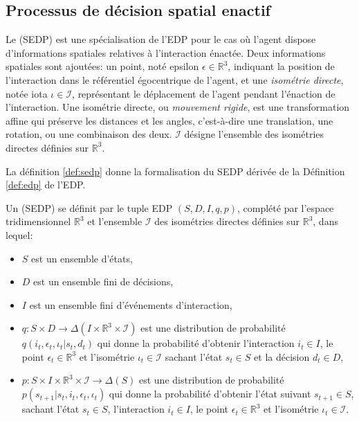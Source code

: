 \subsection{Processus de décision spatial enactif }
\label{sec:sedp}

\noindent
Le  (SEDP) est une spécialisation de l'EDP pour le cas où l'agent dispose d'informations spatiales relatives à l'interaction énactée.  
Deux informations spatiales sont ajoutées: un point, noté epsilon $\epsilon \in \mathbb{R}^3$, indiquant la position de l'interaction dans le référentiel égocentrique de l'agent, 
et une \emph{isométrie directe}, notée iota $\iota \in \mathcal{I}$, représentant le déplacement de l'agent pendant l'énaction de l'interaction.
Une isométrie directe, ou \emph{mouvement rigide}, est une transformation affine qui préserve les distances et les angles, c'est-à-dire une translation, une rotation, ou une combinaison des deux.
$\mathcal{I}$ désigne l'ensemble des isométries directes définies sur $\mathbb{R}^3$.


La définition \ref{def:sedp} donne la formalisation du SEDP dérivée de la Définition \ref{def:edp} de l'EDP. 

\begin{De}[SEDP]
	\label{def:sedp}
	Un  (SEDP) se définit par le tuple EDP $(S, D, I, q, p)$, complété par l'espace tridimensionnel $\mathbb{R}^3$ et l'ensemble $\mathcal{I}$ des isométries directes définies sur $\mathbb{R}^3$, dans lequel:
	\begin{itemize}[label=\scalebox{.85}{$\diamond$}]
		\item $S$ est un ensemble d'états,
		\item $D$ est un ensemble fini de décisions,
		\item $I$ est un ensemble fini d'événements d'interaction,
		\item $q: S\times D \to \Delta(I \times \mathbb{R}^3 \times \mathcal{I})$ est une distribution de probabilité $q(i_t, \epsilon_t, \iota_t|s_t,d_t)$ qui donne la probabilité d'obtenir l'interaction $i_t \in I$, le point $\epsilon_t \in \mathbb{R}^3$ et l'isométrie $\iota_t \in \mathcal{I}$ sachant l'état $s_t \in S$ et la décision $d_t \in D$,
		\item $p:S\times I \times \mathbb{R}^3 \times \mathcal{I} \to \Delta(S) $ est une distribution de probabilité $p(s_{t+1}|s_{t},i_{t}, \epsilon_t, \iota_t)$ qui donne la probabilité d'obtenir l'état suivant $s_{t+1} \in S$, sachant l'état $s_t \in S$, l'interaction $i_t \in I$, le point $\epsilon_t \in \mathbb{R}^3$ et l'isométrie $\iota_t \in \mathcal{I}$.
	\end{itemize}
\end{De}



